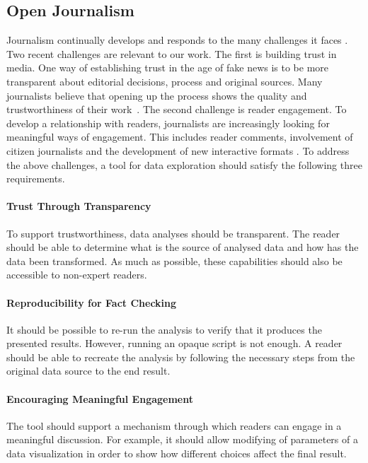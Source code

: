 \documentclass{sigchi}
\begin{document}
\subsection{Open Journalism}
Journalism continually develops and responds to the many challenges it faces \cite{future}.
Two recent challenges are relevant to our work. The first is building trust in media.
One way of establishing trust in the age of fake news is to be more transparent about editorial
decisions, process and original sources. Many journalists believe that opening up the process
shows the quality and trustworthiness of their work~\cite{transparency}.
The second challenge is reader engagement. To develop a relationship with readers, journalists are
increasingly looking for meaningful ways of engagement. This includes reader comments, involvement
of citizen journalists \cite{comments,citizen} and the development of new interactive formats
\cite{youdraw}. To address the above challenges, a tool for data exploration should satisfy the
following three requirements.

\paragraph{Trust Through Transparency}
To support trustworthiness, data analyses should be transparent. The reader should be able to
determine what is the source of analysed data and how has the data been transformed. As much as
possible, these capabilities should also be accessible to non-expert readers.

\paragraph{Reproducibility for Fact Checking}
It should be possible to re-run the analysis to verify that it produces the presented results.
However, running an opaque script is not enough. A reader should be able to recreate the analysis
by following the necessary steps from the original data source to the end result.

\paragraph{Encouraging Meaningful Engagement}
The tool should support a mechanism through which readers can engage in a meaningful discussion.
For example, it should allow modifying of parameters of a data visualization in order to show
how different choices affect the final result.
\end{document}
